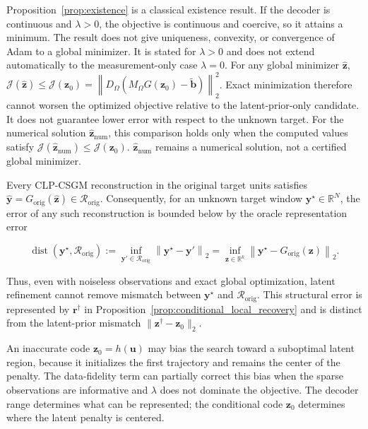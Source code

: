 Proposition~\ref{prop:existence} is a classical existence result. If the
decoder is continuous and $\lambda>0$, the objective is continuous and
coercive, so it attains a minimum. The result does not give uniqueness,
convexity, or convergence of Adam to a global minimizer. It is stated for
$\lambda>0$ and does not extend automatically to the measurement-only case
$\lambda=0$. For any global minimizer $\widehat{\boldsymbol{z}}$,
$\mathcal{J}(\widehat{\boldsymbol{z}})
\leq
\mathcal{J}(\boldsymbol{z}_0)
=
\left\|
D_{\Omega}
\left(
M_{\Omega}G(\boldsymbol{z}_0)
-
\widetilde{\boldsymbol{b}}
\right)
\right\|_2^2$.
Exact minimization therefore cannot worsen the optimized objective relative
to the latent-prior-only candidate. It does not guarantee lower error with
respect to the unknown target. For the numerical solution
$\widehat{\boldsymbol{z}}_{\mathrm{num}}$, this comparison holds only when
the computed values satisfy
$\mathcal{J}(\widehat{\boldsymbol{z}}_{\mathrm{num}})
\leq
\mathcal{J}(\boldsymbol{z}_0)$.
$\widehat{\boldsymbol{z}}_{\mathrm{num}}$ remains a numerical solution, not
a certified global minimizer.


\begin{remark}
\label{rem:representation_error}
Every CLP-CSGM reconstruction in the original target units satisfies
$\widehat{\boldsymbol{y}}
=G_{\mathrm{orig}}(\widehat{\boldsymbol{z}})
\in\mathcal{R}_{\mathrm{orig}}$.
Consequently, for an unknown target window
$\boldsymbol{y}^{\star}\in\mathbb{R}^{N}$, the error of any such
reconstruction is bounded below by the oracle representation error

\begin{equation}
\operatorname{dist}
\left(
\boldsymbol{y}^{\star},
\mathcal{R}_{\mathrm{orig}}
\right)
:=
\inf_{\boldsymbol{y}'\in\mathcal{R}_{\mathrm{orig}}}
\left\|
\boldsymbol{y}^{\star}
-
\boldsymbol{y}'
\right\|_2
=
\inf_{\boldsymbol{z}\in\mathbb{R}^{k}}
\left\|
\boldsymbol{y}^{\star}
-
G_{\mathrm{orig}}(\boldsymbol{z})
\right\|_2.
\label{eq:oracle_decoder_error}
\end{equation}

Thus, even with noiseless observations and exact global optimization, latent
refinement cannot remove mismatch between
$\boldsymbol{y}^{\star}$ and $\mathcal{R}_{\mathrm{orig}}$. This
structural error is represented by $\boldsymbol{r}^{\dagger}$ in
Proposition~\ref{prop:conditional_local_recovery} and is distinct from the
latent-prior mismatch
$\|\boldsymbol{z}^{\dagger}-\boldsymbol{z}_0\|_2$.

An inaccurate code
$\boldsymbol{z}_0=h(\boldsymbol{u})$ may bias the search toward a suboptimal
latent region, because it initializes the first trajectory and remains the
center of the penalty. The data-fidelity term can partially correct this bias when the
sparse observations are informative and $\lambda$ does not dominate the
objective. The decoder range determines what can be represented; the
conditional code $\boldsymbol{z}_0$ determines where the latent penalty is
centered.
\end{remark}


